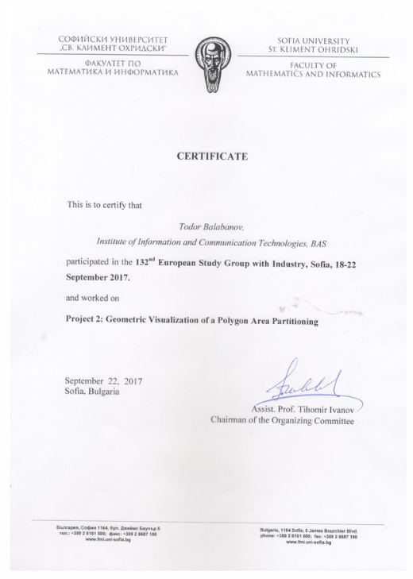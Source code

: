 \documentclass[english,a4paper]{europasscv}
\begin{document}
\includegraphics[width=\textwidth,height=\textheight,keepaspectratio]{ESGI1322017}
\end{document}
